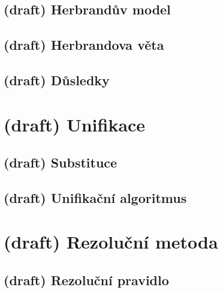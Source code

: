 

\subsection{(draft) Herbrandův model}\todo



\subsection{(draft) Herbrandova věta}\todo



\subsection{(draft) Důsledky}\todo




\section{(draft) Unifikace}\todo



\subsection{(draft) Substituce}\todo



\subsection{(draft) Unifikační algoritmus}\todo




\section{(draft) Rezoluční metoda}\todo



\subsection{(draft) Rezoluční pravidlo}\todo

